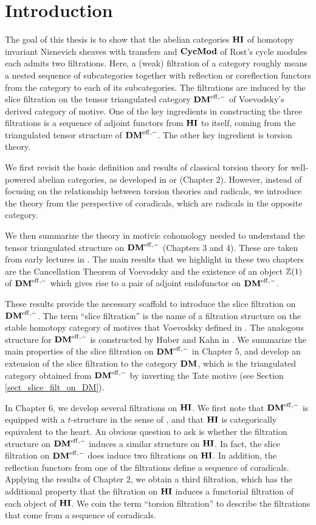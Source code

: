 \chapter{Introduction} 

The goal of this thesis is to show that the abelian categories 
$\mathbf{HI}$ of homotopy invariant Nisnevich sheaves with transfers and 
$\mathbf{CycMod}$ of Rost's cycle modules each admits two filtrations. 
Here, a (weak) filtration of a category roughly means a nested sequence of 
subcategories together with reflection or coreflection functors 
from the category to each of its subcategories. The filtrations 
are induced by the slice filtration on the tensor triangulated 
category $\mathbf{DM}^{\mathrm{eff},-}$ of Voevodsky's derived category of motive. One 
of the key ingredients in constructing the three filtrations is a 
sequence of adjoint functors from $\mathbf{HI}$ to itself, coming from the 
triangulated tensor structure of $\mathbf{DM}^{\mathrm{eff},-}$. The other key 
ingredient is torsion theory.
 
We first revisit the basic definition and results of classical 
torsion theory for well-powered abelian categories, as developed 
in \cite{BJV} or \cite{DTor} (Chapter 2). However, instead of focusing
on the relationship between torsion theories and radicals, we
introduce the theory from the perspective of coradicals, which are 
radicals in the opposite category.  

We then summarize the theory in motivic cohomology needed to 
understand the tensor triangulated structure on $\mathbf{DM}^{\mathrm{eff},-}$ 
(Chapters 3 and 4). These are taken from early lectures in 
\cite{MVW}. The main results that we highlight in these two 
chapters are the Cancellation Theorem of Voevodsky and the
existence of an object $\mathbb{Z}(1)$ of $\mathbf{DM}^{\mathrm{eff},-}$ which gives rise to a pair of 
adjoint endofunctor on $\mathbf{DM}^{\mathrm{eff},-}$. 

These results provide the necessary scaffold to introduce the 
slice filtration on $\mathbf{DM}^{\mathrm{eff},-}$. The term ``slice filtration'' is the
name of a filtration structure on the stable homotopy category 
of motives that Voevodsky defined in \cite{VOP}. The analogous
structure for $\mathbf{DM}^{\mathrm{eff},-}$ is constructed by Huber and Kahn in 
\cite{HuKa}. We summarize the main properties of the slice 
filtration on $\mathbf{DM}^{\mathrm{eff},-}$ in Chapter 5, and develop an extension of
the slice filtration to the category $\mathbf{DM}$, which is the
triangulated category obtained from $\mathbf{DM}^{\mathrm{eff},-}$ by inverting the
Tate motive (see Section \ref{sect_slice_filt_on_DM}).

In Chapter 6, we develop several filtrations on
$\mathbf{HI}$. We first note that $\mathbf{DM}^{\mathrm{eff},-}$ is equipped with a 
$t$-structure in the sense of \cite{BBD}, and that $\mathbf{HI}$ is categorically
equivalent to the heart. An obvious question to ask is whether the
filtration structure on $\mathbf{DM}^{\mathrm{eff},-}$ induces a similar structure on
$\mathbf{HI}$. In fact, the slice filtration on $\mathbf{DM}^{\mathrm{eff},-}$ does induce two
filtrations on $\mathbf{HI}$. In addition, the reflection functors from
one of the filtrations define a sequence of coradicals. Applying
the results of Chapter 2, we obtain a third filtration, which has
the additional property that the filtration on $\mathbf{HI}$ induces a 
functorial filtration of each object of $\mathbf{HI}$. We coin the
term ``torsion filtration'' to describe the filtrations that
come from a sequence of coradicals.

